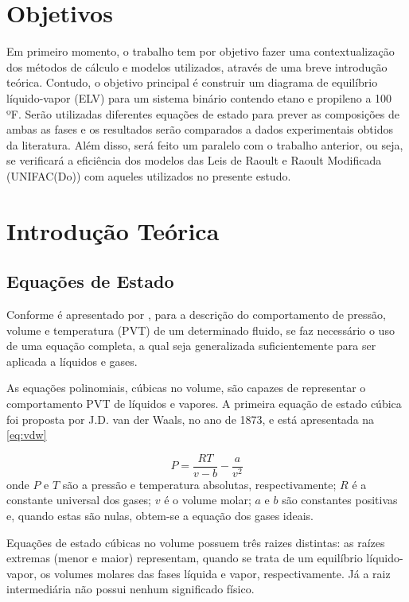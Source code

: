 \section{Objetivos}

Em primeiro momento, o trabalho tem por objetivo fazer uma contextualização dos
métodos de cálculo e modelos utilizados, através de uma breve introdução
teórica. Contudo, o objetivo principal é construir um diagrama de equilíbrio
líquido-vapor (ELV) para um sistema binário contendo etano e propileno a 100 ºF.
Serão utilizadas diferentes equações de estado para prever as composições de ambas
as fases e os resultados serão comparados a dados experimentais obtidos da
literatura. Além disso, será feito um paralelo com o trabalho anterior, ou seja, 
se verificará a eficiência dos modelos das Leis de Raoult e Raoult Modificada
(UNIFAC(Do)) com aqueles utilizados no presente estudo. 



\section{Introdução Teórica}


\subsection{Equações de Estado} 

Conforme é apresentado por
, para a descrição do
comportamento de pressão, volume e temperatura (PVT) de um determinado fluido,
se faz necessário o uso de uma equação completa, a qual seja generalizada
suficientemente para ser aplicada a líquidos e gases.

As equações polinomiais, cúbicas no volume, são capazes de representar o
comportamento PVT de líquidos e vapores. A primeira equação de estado cúbica foi
proposta por J.D. van der Waals, no ano de 1873, e está apresentada na
\autoref{eq:vdw}

\begin{equation}\label{eq:vdw}
P = \frac{RT}{v - b} - \frac{a}{v^2}
\end{equation}
onde $P$ e $T$ são a pressão e temperatura absolutas, respectivamente; $R$ é a
constante universal dos gases; $v$ é o volume molar; $a$ e $b$ são constantes
positivas e, quando estas são nulas, obtem-se a equação dos gases ideais.

Equações de estado cúbicas no volume possuem três raizes distintas: as raízes
extremas (menor e maior) representam, quando se trata de um
equilíbrio líquido-vapor, os volumes molares das fases líquida e vapor,
respectivamente. Já a raiz intermediária não possui nenhum significado físico.

